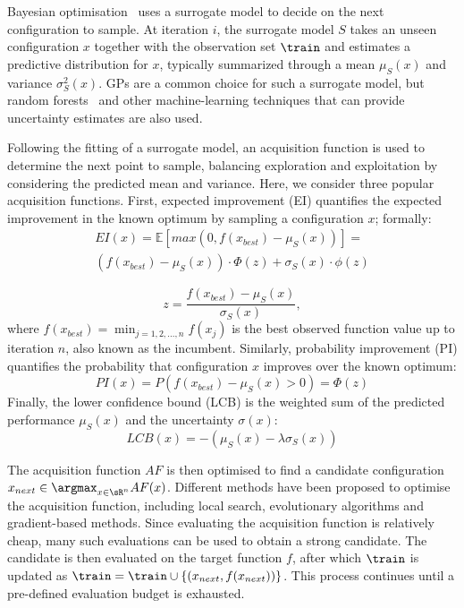 Bayesian optimisation~\citep{Garnett2023} uses a surrogate model to decide on the next configuration to sample. At iteration $i$, the surrogate model $S$ takes an unseen configuration $x$ together with the observation set $\train$ and estimates a predictive distribution for $x$, typically summarized through a mean $\mu_S(x)$ and variance $\sigma_S^2(x)$.
GPs are a common choice for such a surrogate model, but random forests~\citep{HutEtAl11} and other machine-learning techniques that can provide uncertainty estimates are also used.

Following the fitting of a surrogate model, an acquisition function is used to determine the next point to sample, balancing exploration and exploitation by considering the predicted mean and variance. Here, we consider three popular acquisition functions. First, expected improvement (EI) quantifies the expected improvement in the known optimum by sampling a configuration $x$; formally:
\begin{multline}
    EI(x)=\mathbb{E}[max(0, f(x_{best})-\mu_S(x))]=\\(f(x_{best})-\mu_S(x))\cdot\Phi(z)+\sigma_S(x)\cdot\phi(z)
\end{multline}

\begin{equation*}
    z=\frac{f(x_{best})-\mu_S(x)}{\sigma_S(x)},
\end{equation*}
where $f(x_{best})=\min_{j=1, 2, ..., n} f(x _j)$ is the best observed function value up to iteration $n$, also known as the incumbent.
Similarly, probability improvement (PI) quantifies the probability that configuration $x$ improves over the known optimum:
\begin{equation*}
    PI(x)=P(f(x_{best})-\mu_S(x) > 0)=\Phi(z)
\end{equation*}
Finally, the lower confidence bound (LCB) is the weighted sum of the predicted performance $\mu_S(x)$ and the uncertainty $\sigma(x)$:
\begin{equation*}
    LCB(x)=-(\mu_S(x)-\lambda\sigma_S(x))
\end{equation*}

The acquisition function $AF$ is then optimised to find a candidate configuration $x_{next} \in \argmax_{x\in\sR^n}AF(x)$. Different methods have been proposed to optimise the acquisition function, including local search, evolutionary algorithms and gradient-based methods. Since evaluating the acquisition function is relatively cheap, many such evaluations can be used to obtain a strong candidate. The candidate is then evaluated on the target function $f$, after which $\train$ is updated as $\train=\train \cup \{(x_{next}, f(x_{next}))\}$. This process continues until a pre-defined evaluation budget is exhausted.

